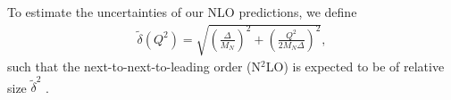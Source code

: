 \documentclass[11pt,preprint,tightenlines,
showpacs,preprintnumbers,amsmath,amssymb,superscriptaddress,a4paper,nofootinbib]{revtex4-1}
\def\beq{\begin{equation}}
\def\eeq{\end{equation}}
\def\eqlab#1{\label{eq:#1}}
\begin{document}





To estimate the uncertainties of our NLO predictions, we define
\begin{align}
 \tilde{\delta}(Q^2) = \sqrt{ \left(\frac{\varDelta}{M_N}\right)^2 + \left(\frac{Q^2}{2 M_N \varDelta}\right)^2 },\eqlab{dtilde}
\end{align}
such that the next-to-next-to-leading order (N$^2$LO) is expected to be of relative size $\tilde{\delta}^2$ \cite{Pascalutsa:2005vq}.
\end{document}

